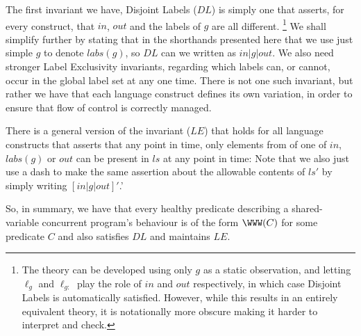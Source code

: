 The first invariant we have, Disjoint Labels ($DL$) is simply one that asserts,
for every construct, that $in$, $out$ and the labels of $g$
are all different.
\footnote{The theory can be developed using only $g$ as a static observation,
and letting $\ell_g$ and $\ell_{g:}$ play the role of $in$ and $out$
respectively, in which case Disjoint Labels is automatically satisfied.
However, while this results in an entirely equivalent theory,
it is notationally more obscure
making it harder to interpret and check.
}%
We shall simplify further by stating that in the shorthands presented
here that we use just simple $g$ to denote $labs(g)$,
so $DL$ can we written as ${in|g|out}$.
We also need stronger Label Exclusivity invariants,
regarding which labels can, or cannot,
occur in the global label set at any one time.
There is not one such invariant,
but rather we have that each language construct defines its own
variation, in order to ensure that flow of control is correctly managed.

There is a general version of the invariant ($LE$) that holds
for all language constructs that asserts that any point in time,
only elements from of one of $in$, $labs(g)$ or $out$
can be present in $ls$ at any point in time:
Note that we also just use a dash to make
the same assertion about the allowable contents of $ls'$
by simply writing $[in|g|out]'$.'

So, in summary, we have that every healthy predicate describing
a shared-variable concurrent program's behaviour is of the form $\WWW(C)$
for some predicate $C$ and also satisfies $DL$ and maintains $LE$.
